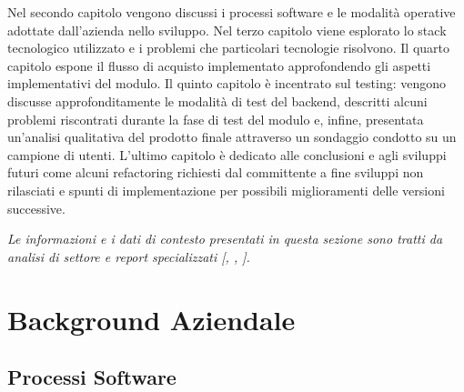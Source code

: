 \documentclass[target=bach,aauheader=,style=]{thud}
\begin{document}
Nel secondo capitolo vengono discussi i processi software e le modalità operative adottate dall'azienda nello sviluppo. Nel terzo capitolo viene esplorato lo stack tecnologico utilizzato e i problemi
che particolari tecnologie risolvono. Il quarto capitolo espone il flusso di acquisto implementato approfondendo gli aspetti implementativi del modulo. Il quinto capitolo è incentrato sul testing:
vengono discusse approfonditamente le modalità di test del backend, descritti alcuni problemi riscontrati durante la fase di test del modulo e, infine, presentata un'analisi qualitativa del prodotto
finale attraverso un sondaggio condotto su un campione di utenti. L'ultimo capitolo è dedicato alle conclusioni e agli sviluppi futuri come alcuni refactoring richiesti dal committente a fine sviluppi
non rilasciati e spunti di implementazione per possibili miglioramenti delle versioni successive.

\textit{Le informazioni e i dati di contesto presentati in questa sezione sono tratti da analisi di settore e report specializzati [\cite{dnjournal_soti_2026}, \cite{itcom_trend_2026}, \cite{circleid_2025}].}


\chapter{Background Aziendale}

\section{Processi Software}
\end{document}
